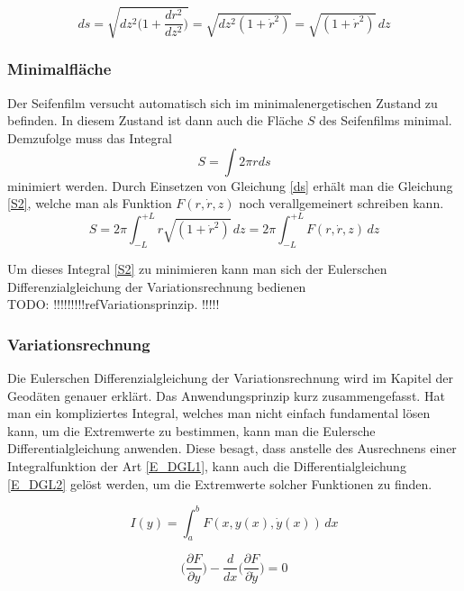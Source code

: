 \begin{refsection}
\begin{equation} \label{ds}
  ds=\sqrt{dz^2\bigg(1+\frac{dr^2}{dz^2}\bigg)}= \sqrt{dz^2(1+\dot r^2)}=\sqrt{(1+\dot r^2)}\,dz
\end{equation}
\subsubsection{Minimalfläche}
Der Seifenfilm versucht automatisch sich im minimalenergetischen Zustand zu befinden. In diesem Zustand ist dann auch die Fläche $S$ des Seifenfilms minimal.
Demzufolge muss das Integral 
\begin{equation} \label{S1}  
  S= \int 2 \pi r ds 
\end{equation}
minimiert werden. 
Durch Einsetzen von Gleichung \eqref{ds} erhält man die Gleichung \eqref{S2}, welche man als Funktion $F(r,\dot r, z)$ noch verallgemeinert schreiben kann.
\begin{equation} \label{S2}
  S=2 \pi \int_{-L}^{+L} r\sqrt{(1+\dot r^2)}\,dz =2 \pi \int_{-L}^{+L}  F(r,\dot r, z) \,dz 
\end{equation}


Um dieses Integral \eqref{S2} zu minimieren kann man sich der Eulerschen Differenzialgleichung der Variationsrechnung bedienen 
\\TODO: !!!!!!!!!ref{Variationsprinzip}. !!!!!
\subsubsection{Variationsrechnung}
Die Eulerschen Differenzialgleichung der Variationsrechnung wird im Kapitel der Geodäten genauer erklärt.
Das Anwendungsprinzip kurz zusammengefasst. Hat man ein kompliziertes Integral, welches man nicht einfach fundamental lösen kann, um die Extremwerte zu bestimmen, kann man die Eulersche Differentialgleichung anwenden. Diese besagt, dass anstelle des Ausrechnens  einer Integralfunktion der Art \eqref{E_DGL1}, kann auch die Differentialgleichung \eqref{E_DGL2} gelöst werden, um die Extremwerte solcher Funktionen zu finden.

\begin{equation} \label{E_DGL1}  
  I(y)= \int_a^b F(x,y(x),\dot y(x))\,dx       
\end{equation}

\begin{equation} \label{E_DGL2}
\bigg(\frac{\partial F}{\partial y}\bigg)- \frac{d}{dx} \bigg(\frac{\partial F}{\partial \dot{y}}\bigg)=0         
\end{equation}


\end{refsection}
